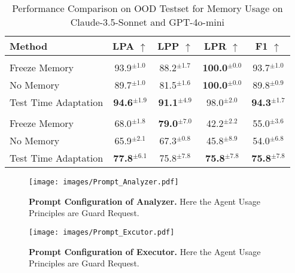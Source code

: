 \begin{table*}[ht]
    \centering
    {
    \setlength{\tabcolsep}{23pt}
    \begin{threeparttable}
    \begin{tabular}{@{}lcccc@{}}
        \toprule
        \textbf{Method} & \textbf{LPA} $\uparrow$ & \textbf{LPP} $\uparrow$ & \textbf{LPR} $\uparrow$ & \textbf{F1} $\uparrow$ \\
        \midrule
        \rowcolor[RGB]{230, 230, 230} \multicolumn{5}{c}{\textbf{Claude-3.5-Sonnet}} \\
        Freeze Memory & 93.9$^{\pm 1.0}$ & 88.2$^{\pm 1.7}$ & \textbf{100.0}$^{\pm 0.0}$ & 93.7$^{\pm 1.0}$ \\
        No Memory     & 89.7$^{\pm 1.0}$ & 81.5$^{\pm 1.6}$ & \textbf{100.0}$^{\pm 0.0}$ & 89.8$^{\pm 0.9}$ \\
        Test Time Adaptation     & \textbf{94.6}$^{\pm 1.9}$ & \textbf{91.1}$^{\pm 4.9}$ & 98.0$^{\pm 2.0}$ & \textbf{94.3}$^{\pm 1.7}$ \\
        \midrule
        \rowcolor[RGB]{230, 230, 230} \multicolumn{5}{c}{\textbf{GPT-4o-mini}} \\
        Freeze Memory & 68.0$^{\pm 1.8}$ & \textbf{79.0}$^{\pm 7.0}$ & 42.2$^{\pm 2.2}$ & 55.0$^{\pm 3.6}$ \\
        No Memory     & 65.9$^{\pm 2.1}$ & 67.3$^{\pm 0.8}$ & 45.8$^{\pm 8.9}$ & 54.0$^{\pm 6.8}$ \\
        Test Time Adaptation     & \textbf{77.8}$^{\pm 6.1}$ & 75.8$^{\pm 7.8}$ & \textbf{75.8}$^{\pm 7.8}$ & \textbf{75.8}$^{\pm 7.8}$ \\
        \bottomrule
    \end{tabular}
    \end{threeparttable}
    }
    \caption{Performance Comparison on OOD Testset for Memory Usage on Claude-3.5-Sonnet and GPT-4o-mini}
    \label{app:ablation:OOD}
\end{table*}




\begin{figure*}[!th]
    \centering
    \texttt{[image: images/Prompt\_Analyzer.pdf]}
    \caption{\textbf{Prompt Configuration of Analyzer.} Here the Agent Usage Principles are Guard Request.}
    \vspace{-0.8em}
    \label{app:method:prompt_configuration_analyzer}
\end{figure*}


\begin{figure*}[!th]
    \centering
    \texttt{[image: images/Prompt\_Excutor.pdf]}
    \caption{\textbf{Prompt Configuration of Executor.} Here the Agent Usage Principles are Guard Request.}
    \vspace{-0.8em}
    \label{app:method:prompt_configuration_executor}
\end{figure*}



